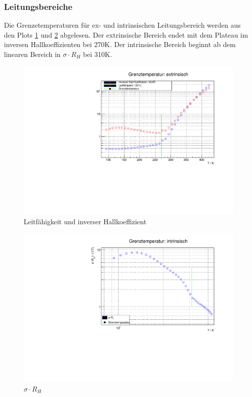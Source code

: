 
\FloatBarrier
\subsubsection{Leitungsbereiche}

Die Grenzetemperaturen für ex- und intrinsischen Leitungsbereich werden aus den Plots \ref{fig:leitex} und \ref{fig:leitin} abgelesen.
Der extrinsische Bereich endet mit dem Plateau im inversen Hallkoeffizienten bei 270K. Der intrinsische Bereich beginnt ab dem linearen Bereich in $\sigma \cdot R_{H}$ bei 310K.

\begin{figure}
\label{fig:leitex}
\centering
\includegraphics[scale = 0.35]{../data/A2ex.pdf}
\caption{Leitfähigkeit und inverser Hallkoeffizient}
\end{figure}

\begin{figure}
\label{fig:leitin}
\centering
\includegraphics[scale = 0.35]{../data/A2in.pdf}
\caption{$\sigma \cdot R_{H}$}
\end{figure}

